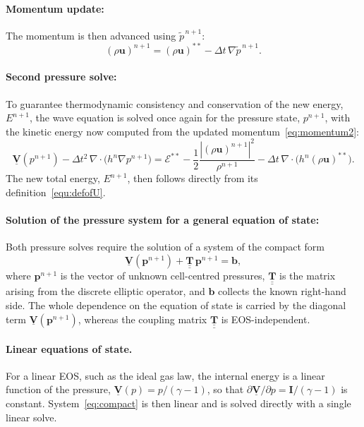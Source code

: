 \documentclass[a4paper,fleqn]{cas-sc}
\theoremstyle{definition}
\theoremstyle{remark}
\begin{document}
\paragraph{Momentum update:}
The momentum is then advanced using $\tilde{p}^{\,n+1}$:
\begin{equation}
\label{eq:momentum2}
(\rho\mathbf{u})^{n+1} = (\rho\mathbf{u})^{**}
- \Delta t\,\nabla\tilde{p}^{\,n+1}.
\end{equation}

\paragraph{Second pressure solve:}
To guarantee thermodynamic consistency and conservation of the new energy,
$E^{n+1}$, the wave equation is solved once again for the pressure state,
$p^{n+1}$, with the kinetic energy now computed from the updated
momentum~\eqref{eq:momentum2}:
\begin{equation}
\label{eq:pressuresecond}
\underline{\mathbf{V}}(p^{n+1})
- \Delta t^{2}\,\nabla\!\cdot\!\big(h^{n}\nabla p^{n+1}\big)
= \mathcal{E}^{**} - \frac{1}{2}\frac{|(\rho\mathbf{u})^{n+1}|^{2}}{\rho^{n+1}}
- \Delta t\,\nabla\!\cdot\!\big(h^{n}(\rho\mathbf{u})^{**}\big).
\end{equation}
The new total energy, $E^{n+1}$, then follows directly from its
definition~\eqref{equ:defofU}.

\paragraph{Solution of the pressure system for a general equation of state:}
\label{sec:eos_solve}
Both pressure solves require the solution of a system of the compact form
\begin{equation}
\label{eq:compact}
\underline{\mathbf{V}}(\mathbf{p}^{n+1})
+ \underline{\underline{\mathbf{T}}}\,\mathbf{p}^{n+1} = \mathbf{b},
\end{equation}
where $\mathbf{p}^{n+1}$ is the vector of unknown cell-centred pressures,
$\underline{\underline{\mathbf{T}}}$ is the matrix arising from the
discrete elliptic operator, and
$\mathbf{b}$ collects the known right-hand side. The whole dependence on the
equation of state is carried by the diagonal term
$\underline{\mathbf{V}}(\mathbf{p}^{n+1})$, whereas the coupling matrix
$\underline{\underline{\mathbf{T}}}$ is EOS-independent.

\paragraph{Linear equations of state.}
For a linear EOS, such as the ideal gas law, the internal energy is a linear
function of the pressure, $\underline{\mathbf{V}}(p)=p/(\gamma-1)$, so that
$\partial\underline{\mathbf{V}}/\partial p = \mathbf{I}/(\gamma-1)$ is constant.
System~\eqref{eq:compact} is then linear and is solved directly with a single
linear solve.
\end{document}

